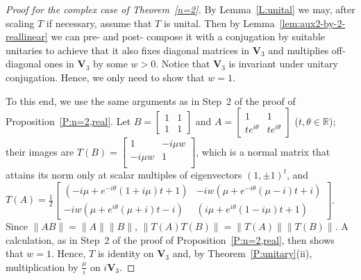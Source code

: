 \documentclass[11pt]{article}
\numberwithin{equation}{section}
\def\IR{{\mathbb R}}
\def\bV{{\mathbf V}}
\def\bV{{\mathbf V}}
\begin{document}
\begin{proof}[Proof for the complex case of  Theorem~\ref{n=2}]
By Lemma~\ref{L:unital} we may, after scaling $T$ if necessary, assume that $T$ is unital.  Then by Lemma~\ref{lem:aux2-by-2-reallinear} we can pre- and post- compose it with a conjugation by suitable unitaries to achieve that it also fixes diagonal matrices in $\bV_3$ and multiplies off-diagonal ones in $\bV_3$ by some $w>0$. Notice that $\bV_3$ is invariant under unitary conjugation. Hence, we only need to show that $w=1$.

To this end, we use
the same arguments as in Step~2 of  the proof of Proposition~\ref{P:n=2,real}.
Let $B = \left[\begin{smallmatrix}
1  & 1\\
1& 1\end{smallmatrix}\right]$ and $A=
\left[\begin{smallmatrix}
1 & 1\\
te^{i\theta} & te^{i\theta}\end{smallmatrix}\right]$  ($t,\theta\in\IR$); their
images are
$T(B)= \left[
\begin{smallmatrix}
 1 & -i \mu  w \\
 -i \mu  w & 1 \\
\end{smallmatrix}
\right]$, which is a normal matrix that attains its norm only at scalar multiples of eigenvectors $(1,\pm1)^t$, and $T(A)= \frac{1}{2}\left[
\begin{smallmatrix}
 \left(-i \mu +e^{-i \theta } (1+i \mu ) t+1\right)
   & -i w \left(\mu +e^{-i \theta } (\mu -i)
   t+i\right) \\
 - i w \left(\mu +e^{i \theta } (\mu +i) t-i\right) &
    \left(i \mu +e^{i \theta } (1-i \mu ) t+1\right)
\end{smallmatrix}
\right]$.  Since $\|AB\| = \|A\| \|B\|$, $\|T(A) T(B)\| = \|T(A)\| \|T(B)\|$.  A calculation, as in Step~2 of  the proof of Proposition~\ref{P:n=2,real}, then
 shows that $w=1$. Hence, $T$ is identity on $\bV_3$ and, by Theorem~\ref{P:unitary}(ii), multiplication by $\frac{\mu}{i} $ on $i\bV_3$.
 \medskip



\end{proof}
\end{document}
